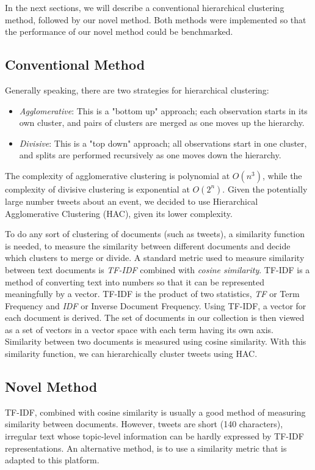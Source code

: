 \documentclass[letterpaper]{article}
\begin{document}
In the next sections, we will describe a conventional hierarchical clustering method, followed by our novel method. Both methods were implemented so that the performance of our novel method could be benchmarked.



\subsection{Conventional Method}
Generally speaking, there are two strategies for hierarchical clustering: %
\begin{itemize}
\item \emph{Agglomerative}: This is a "bottom up" approach; each observation starts in its own cluster, and pairs of clusters are merged as one moves up the hierarchy.
\item \emph{Divisive}: This is a "top down" approach; all observations start in one cluster, and splits are performed recursively as one moves down the hierarchy.
\end{itemize}

The complexity of agglomerative clustering is polynomial at $O(n^{3})$, while the complexity of divisive clustering is exponential at $O(2^{n})$. Given the potentially large number tweets about an event, we decided to use Hierarchical Agglomerative Clustering (HAC), given its lower complexity.

To do any sort of clustering of documents (such as tweets), a similarity function is needed, to measure the similarity between different documents and decide which clusters to merge or divide. A standard metric used to measure similarity between text documents is \emph{TF-IDF} combined with \emph{cosine similarity}. TF-IDF is a method of converting text into numbers so that it can be represented meaningfully by a vector. TF-IDF is the product of two statistics, \emph{TF} or Term Frequency and \emph{IDF} or Inverse Document Frequency.
Using TF-IDF, a vector for each document is derived. The set of documents in our collection is then viewed as a set of vectors in a vector space with each term  having its own axis. Similarity between two documents is measured using cosine similarity. With this similarity function, we can hierarchically cluster tweets using HAC. %






\subsection{Novel Method}
TF-IDF, combined with cosine similarity is usually a good method of measuring similarity between documents. However, tweets are short (140 characters), irregular text whose topic-level information can be hardly expressed by TF-IDF representations. An alternative method, is to use a similarity metric that is adapted to this platform.
\end{document}
